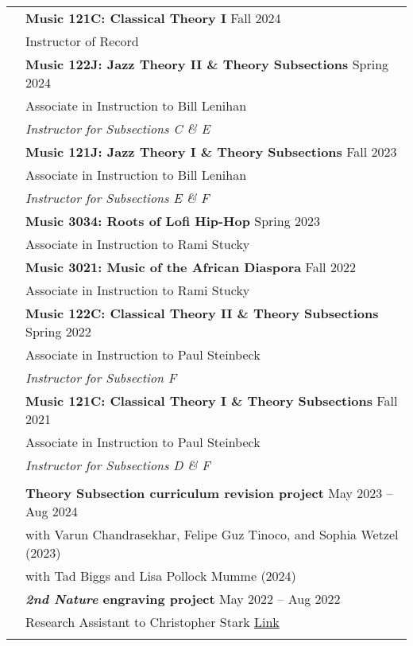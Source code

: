 \documentclass[letterpaper, 11pt]{article}
\begin{document}
\begin{longtable}{p{1.3in}p{4.8in}}
{\color{OliveGreen}{Courses Taught}}
& \textbf{Music 121C: Classical Theory I} \hfill Fall 2024 \\
& Instructor of Record \\
& \textbf{Music 122J: Jazz Theory II \& Theory Subsections} \hfill Spring 2024 \\
& Associate in Instruction to Bill Lenihan \\
& \textit{Instructor for Subsections C \& E} \\
& \textbf{Music 121J: Jazz Theory I \& Theory Subsections} \hfill Fall 2023 \\
& Associate in Instruction to Bill Lenihan \\
& \textit{Instructor for Subsections E \& F} \\
& \textbf{Music 3034: Roots of Lofi Hip-Hop} \hfill Spring 2023 \\
& Associate in Instruction to Rami Stucky \\
& \textbf{Music 3021: Music of the African Diaspora} \hfill Fall 2022 \\
& Associate in Instruction to Rami Stucky \\
& \textbf{Music 122C: Classical Theory II \& Theory Subsections} \hfill Spring 2022 \\
& Associate in Instruction to Paul Steinbeck \\
& \textit{Instructor for Subsection F} \\
& \textbf{Music 121C: Classical Theory I \& Theory Subsections} \hfill Fall 2021 \\
& Associate in Instruction to Paul Steinbeck \\
& \textit{Instructor for Subsections D \& F} \\
& \\

\nohyphens{\color{OliveGreen}{Research Projects}} 
& \textbf{Theory Subsection curriculum revision project} \hfill May 2023 -- Aug 2024 \\
& with Varun Chandrasekhar, Felipe Guz Tinoco, and Sophia Wetzel \hfill (2023) \\
& with Tad Biggs and Lisa Pollock Mumme \hfill (2024) \\
& \textbf{\textit{2nd Nature} engraving project}  \hfill May 2022 -- Aug 2022\\
& Research Assistant to Christopher Stark \hfill \href{https://www.christopher-stark.com/scores/solo/2ndNature.pdf}{Link} \\
& \\


\end{longtable}
\end{document}
